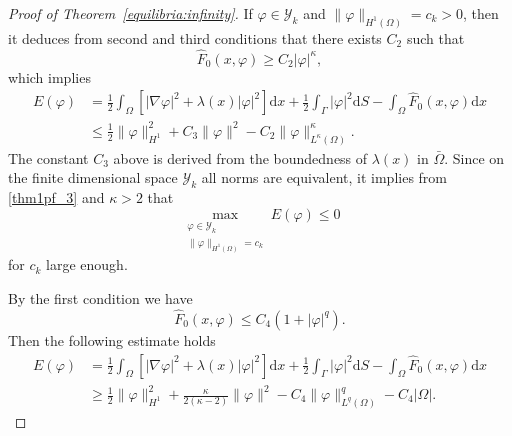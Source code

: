 \documentclass{elsarticle}
\begin{document}
\begin{proof}[Proof of Theorem~\ref{equilibria:infinity}]
If $\varphi\in \mathcal{Y}_k$ and $\|\varphi\|_{H^1(\Omega)} =c_k  > 0$, then it deduces from second and third conditions that there exists $C_2$ such that
\[
	\hat{F}_0(x, \varphi)\geqslant C_2|\varphi|^{\kappa},
\]
which implies
\begin{equation}\label{thm1pf_3}
\begin{split}
	E(\varphi)&=\frac{1}{2}\int_{\Omega}\left[ |\nabla \varphi|^2 + \lambda(x)|\varphi|^2\right] \mathrm{d}x +  \frac{1}{2}\int_{\Gamma}|\varphi|^2\mathrm{d}S - \int_{\Omega}\hat{F}_0(x, \varphi)\mathrm{d}x\\
	&\leqslant \frac{1}{2} \|\varphi\|^2_{H^1} + C_3 \|\varphi\|^2 -C_2\|\varphi\|^{\kappa}_{L^{\kappa}(\Omega)}.
\end{split}
\end{equation}
The constant $C_3$ above  is derived from the boundedness of $\lambda(x)$ in $\bar{\Omega}$. 
Since on the finite dimensional space $\mathcal{Y}_k$ all norms are equivalent, it implies from \eqref{thm1pf_3} and $\kappa > 2$ that 
\begin{equation}\label{thm1pf_4}
	\max_{\substack{\varphi\in \mathcal{Y}_k \\ \|\varphi\|_{H^1(\Omega)} =c_k}}E(\varphi) \leqslant 0
\end{equation}
for $c_k$ large enough.

By the first condition we have
\[
	\hat{F}_0(x, \varphi) \leqslant C_4\left(1+|\varphi|^q \right).
\]
Then the following estimate holds
\begin{equation}\label{thm1pf_5}
\begin{split}
	E(\varphi)&=\frac{1}{2}\int_{\Omega}\left[ |\nabla \varphi|^2 + \lambda(x)|\varphi|^2\right] \mathrm{d}x +  \frac{1}{2}\int_{\Gamma}|\varphi|^2\mathrm{d}S - \int_{\Omega}\hat{F}_0(x, \varphi)\mathrm{d}x\\
	&\geqslant \frac{1}{2} \|\varphi\|^2_{H^1} + \frac{\kappa}{2(\kappa-2)} \|\varphi\|^2 -C_4\|\varphi\|^{q}_{L^{q}(\Omega)} -C_4|\Omega|.
\end{split}
\end{equation}


\end{proof}
\end{document}

